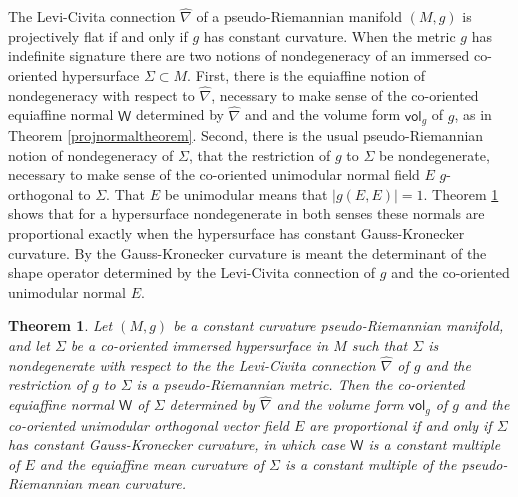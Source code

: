 \documentclass [leqno, 10pt]{amsart}
\newtheorem{theorem}{Theorem}[section]
\theoremstyle{definition}
\numberwithin{equation}{section}
\newcommand{\vol}{\mathsf{vol}}
\newcommand{\nm}{\mathsf{W}}
\newcommand{\hnabla}{\widehat{\nabla}}
\begin{document}
The Levi-Civita connection $\hnabla$ of a pseudo-Riemannian manifold $(M, g)$ is projectively flat if and only if $g$ has constant curvature. When the metric $g$ has indefinite signature there are two notions of nondegeneracy of an immersed co-oriented hypersurface $\Sigma \subset M$. First, there is the equiaffine notion of nondegeneracy with respect to $\hnabla$, necessary to make sense of the co-oriented equiaffine normal $\nm$ determined by $\hnabla$ and and the volume form $\vol_{g}$ of $g$, as in Theorem \ref{projnormaltheorem}. Second, there is the usual pseudo-Riemannian notion of nondegeneracy of $\Sigma$, that the restriction of $g$ to $\Sigma$ be nondegenerate, necessary to make sense of the co-oriented unimodular normal field $E$ $g$-orthogonal to $\Sigma$. That $E$ be unimodular means that $|g(E, E)| = 1$. Theorem \ref{normalstheorem} shows that for a hypersurface nondegenerate in both senses these normals are proportional exactly when the hypersurface has constant Gauss-Kronecker curvature. By the Gauss-Kronecker curvature is meant the determinant of the shape operator determined by the Levi-Civita connection of $g$ and the co-oriented unimodular normal $E$.

\begin{theorem}\label{normalstheorem}
Let $(M, g)$ be a constant curvature pseudo-Riemannian manifold, and let $\Sigma$ be a co-oriented immersed hypersurface in $M$ such that $\Sigma$ is nondegenerate with respect to the the Levi-Civita connection $\hnabla$ of $g$ and the restriction of $g$ to $\Sigma$ is a pseudo-Riemannian metric. Then the co-oriented equiaffine normal $\nm$ of $\Sigma$ determined by $\hnabla$ and the volume form $\vol_{g}$ of $g$ and the co-oriented unimodular orthogonal vector field $E$ are proportional if and only if $\Sigma$ has constant Gauss-Kronecker curvature, in which case $\nm$ is a constant multiple of $E$ and the equiaffine mean curvature of $\Sigma$ is a constant multiple of the pseudo-Riemannian mean curvature.
\end{theorem}
\end{document}
